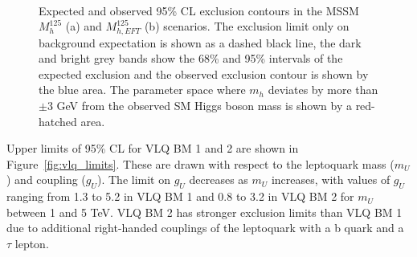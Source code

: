 \begin{figure}[!hbtp]
\centering
     \\
\caption[Plots of the model-dependent limits in MSSM benchmark scenarios.]{Expected and observed 95\% CL exclusion contours in the MSSM $M_{h}^{125}$ (a) and $M_{h,EFT}^{125}$ (b) scenarios. The exclusion limit only on background expectation is shown as a dashed black line, the dark and bright grey bands show the 68\% and 95\% intervals of the expected exclusion and the observed exclusion contour is shown by the blue area. The parameter space where $m_{h}$ deviates by more than $\pm$3  GeV from the observed SM Higgs boson mass is shown by a red-hatched area.~\cite{CMS:2022rbd}
}
\label{fig:mssm_limits}
\end{figure}

Upper limits of 95\% \ac{CL} for VLQ BM 1 and 2 are shown in Figure~\ref{fig:vlq_limits}. 
These are drawn with respect to the leptoquark mass ($m_{U}$) and coupling ($g_{U}$).
The limit on $g_{U}$ decreases as $m_{U}$ increases, with values of $g_U$ ranging from 1.3 to 5.2 in VLQ BM 1 and 0.8 to 3.2 in VLQ BM 2 for $m_U$ between 1 and 5 TeV. 
VLQ BM 2 has stronger exclusion limits than VLQ BM 1 due to additional right-handed couplings of the leptoquark with a b quark and a $\tau$ lepton. \\

